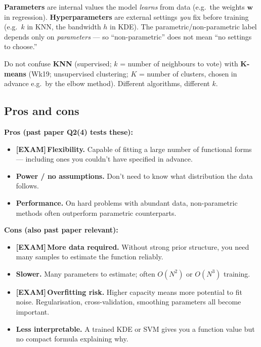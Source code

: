 \documentclass[11pt, a4paper]{article}
\newcommand{\examflag}{\textcolor{tipBd}{\textbf{[EXAM]}}\,}
\begin{document}
\begin{trapbox}
\textbf{Parameters} are internal values the model \emph{learns} from data (e.g.\ the weights $\mathbf{w}$ in regression). \textbf{Hyperparameters} are external settings \emph{you} fix before training (e.g.\ $k$ in KNN, the bandwidth $h$ in KDE). The parametric/non-parametric label depends only on \emph{parameters} --- so ``non-parametric'' does not mean ``no settings to choose.''

Do not confuse \textbf{KNN} (supervised; $k$ = number of neighbours to vote) with \textbf{K-means} (Wk19; unsupervised clustering; $K$ = number of clusters, chosen in advance e.g.\ by the elbow method). Different algorithms, different $k$.
\end{trapbox}

\subsection{Pros and cons}

\textbf{Pros (past paper Q2(4) tests these):}
\begin{itemize}
  \item \examflag{}\textbf{Flexibility.} Capable of fitting a large number of functional forms — including ones you couldn't have specified in advance.
  \item \textbf{Power / no assumptions.} Don't need to know what distribution the data follows.
  \item \textbf{Performance.} On hard problems with abundant data, non-parametric methods often outperform parametric counterparts.
\end{itemize}

\textbf{Cons (also past paper relevant):}
\begin{itemize}
  \item \examflag{}\textbf{More data required.} Without strong prior structure, you need many samples to estimate the function reliably.
  \item \textbf{Slower.} Many parameters to estimate; often $O(N^2)$ or $O(N^3)$ training.
  \item \examflag{}\textbf{Overfitting risk.} Higher capacity means more potential to fit noise. Regularisation, cross-validation, smoothing parameters all become important.
  \item \textbf{Less interpretable.} A trained KDE or SVM gives you a function value but no compact formula explaining why.
\end{itemize}
\end{document}
